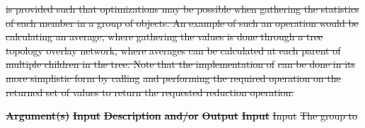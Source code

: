 \documentclass[12pt]{report} %
\providecommand{\DIFdeltex}[1]{{\protect\color{red}\sout{#1}}}                      %
\providecommand{\DIFdelend}{} %
\providecommand{\DIFdel}[1]{\texorpdfstring{\DIFdeltex{#1}}{}} %
\DeclareRobustCommand{\DIFdelend}{\DIFOaddend \let\includegraphics\DIFOincludegraphics} %
\begin{document}
\DIFdel{is provided such that optimizations may be possible when gathering the statistics of each member in a group of objects.  
An example of such an operation would be calculating an average, where gathering the values is done through a tree topology overlay network, where averages can be calculated at each parent of multiple children in the tree.
Note that the implementation of }%
\DIFdel{can be done in its more simplistic form by calling }%
\DIFdel{and performing the required operation on the returned set of values to return the requested reduction operation.
}%

\textbf{\DIFdel{Argument(s)}} %
\textbf{\DIFdel{Input }}  %
\textbf{\DIFdel{Description}} %
\textbf{\DIFdel{and/or}}     %
\textbf{\DIFdel{Output}} %
\textbf{\DIFdel{Input}} %
\DIFdel{Input        }%
\DIFdel{The group to }\DIFdelend %
\end{document}
